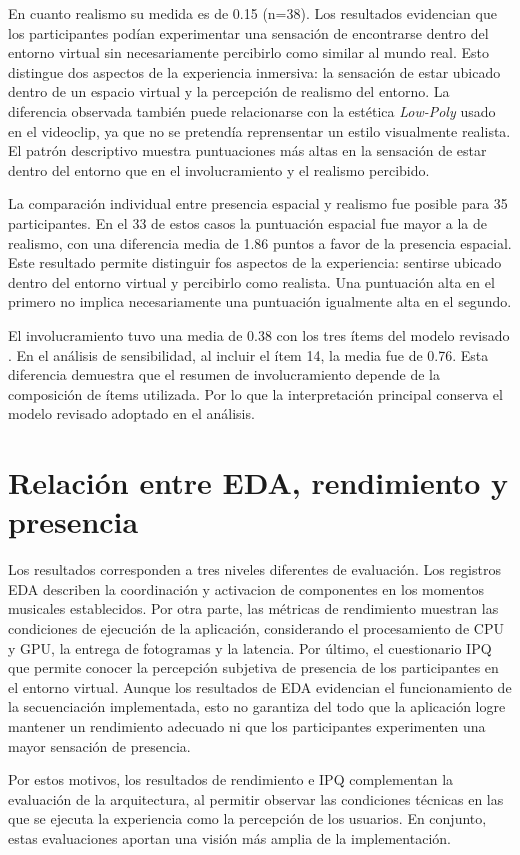 En cuanto realismo su medida es de 0.15 (n=38). 
Los resultados evidencian que los participantes podían experimentar una sensación
de encontrarse dentro del entorno virtual sin necesariamente percibirlo como similar al mundo real. 
Esto distingue dos aspectos de la experiencia inmersiva: la sensación de estar ubicado dentro de un espacio virtual
y la percepción de realismo del entorno. La diferencia observada también puede relacionarse con la estética \emph{Low-Poly}
usado en el videoclip, ya que no se pretendía reprensentar un estilo visualmente realista.
El patrón descriptivo muestra puntuaciones más altas en la sensación de estar dentro del entorno que en el involucramiento y el realismo percibido. 

La comparación individual entre presencia espacial y realismo fue posible para 35 participantes. 
En el 33 de estos casos la puntuación espacial fue mayor a la de realismo, con una diferencia media de 1.86 puntos a favor de la presencia espacial. 
Este resultado permite distinguir fos aspectos de la experiencia: sentirse ubicado dentro del entorno virtual y percibirlo como realista. 
Una puntuación alta en el primero no implica necesariamente una puntuación igualmente alta en el segundo. 

El involucramiento tuvo una media de 0.38 con los tres ítems del modelo revisado \cite{castro2026immersive}. 
En el análisis de sensibilidad, al incluir el ítem 14, la media fue de 0.76. 
Esta diferencia demuestra que el resumen de involucramiento depende de la composición de ítems utilizada.
Por lo que la interpretación principal conserva el modelo revisado adoptado en el análisis.
 
\section{Relación entre EDA, rendimiento y presencia}
Los resultados corresponden a tres niveles diferentes de evaluación. 
Los registros EDA describen la coordinación y activacion de componentes en los momentos musicales establecidos. 
Por otra parte, las métricas de rendimiento muestran las condiciones de ejecución de la aplicación, considerando el procesamiento de CPU y GPU, la entrega de fotogramas y la latencia.
Por último, el cuestionario IPQ que permite conocer la percepción subjetiva de presencia de los participantes en el entorno virtual.
Aunque los resultados de EDA evidencian el funcionamiento de la secuenciación implementada, esto no garantiza del todo que la aplicación logre mantener un rendimiento adecuado ni que los participantes experimenten una mayor sensación de presencia.

Por estos motivos, los resultados de rendimiento e IPQ complementan la evaluación de la arquitectura, al permitir observar las condiciones técnicas en las que se ejecuta la experiencia como la percepción de los usuarios. 
En conjunto, estas evaluaciones aportan una visión más amplia de la implementación.


